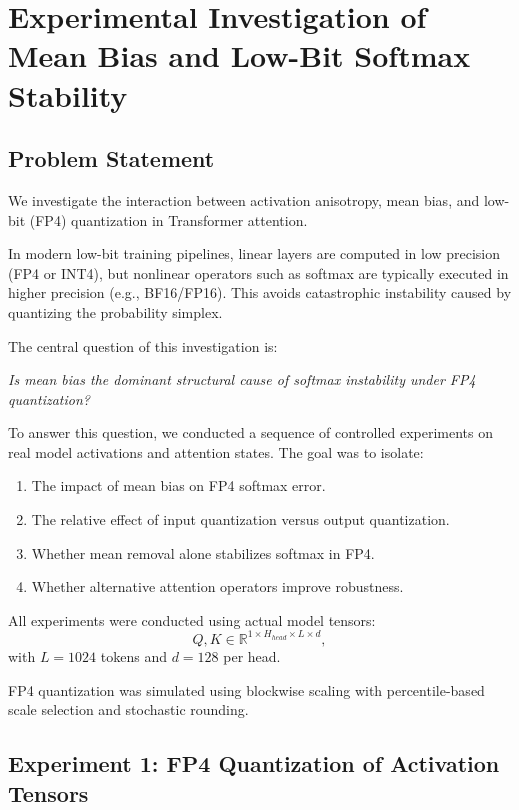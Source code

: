 \chapter{Experimental Investigation of Mean Bias and Low-Bit Softmax Stability}
\label{chap:fp4_softmax_report}

\section{Problem Statement}

We investigate the interaction between activation anisotropy, mean bias, and
low-bit (FP4) quantization in Transformer attention.

In modern low-bit training pipelines, linear layers are computed in low precision
(FP4 or INT4), but nonlinear operators such as softmax are typically executed in
higher precision (e.g., BF16/FP16). This avoids catastrophic instability caused by
quantizing the probability simplex.

The central question of this investigation is:

\begin{center}
\emph{Is mean bias the dominant structural cause of softmax instability under FP4 quantization?}
\end{center}

To answer this question, we conducted a sequence of controlled experiments on
real model activations and attention states. The goal was to isolate:

\begin{enumerate}
\item The impact of mean bias on FP4 softmax error.
\item The relative effect of input quantization versus output quantization.
\item Whether mean removal alone stabilizes softmax in FP4.
\item Whether alternative attention operators improve robustness.
\end{enumerate}

All experiments were conducted using actual model tensors:
\[
Q, K \in \mathbb{R}^{1 \times H_{head} \times L \times d},
\]
with $L=1024$ tokens and $d=128$ per head.

FP4 quantization was simulated using blockwise scaling with percentile-based scale
selection and stochastic rounding.

\section{Experiment 1: FP4 Quantization of Activation Tensors}

